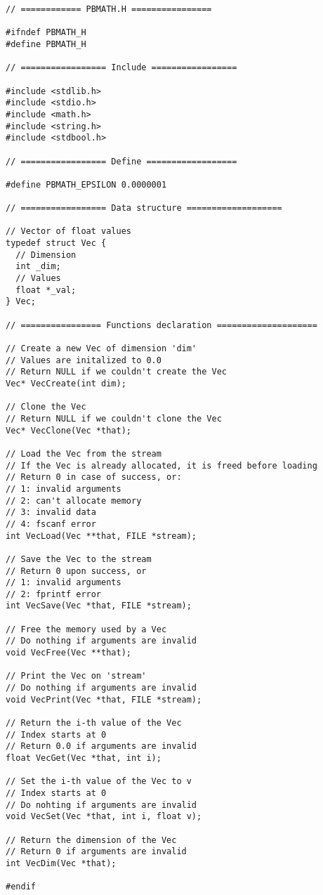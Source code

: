 \documentclass[12pt, a4paper]{article}
\begin{document}
\begin{scriptsize}
\begin{ttfamily}
\begin{lstlisting}
// ============ PBMATH.H ================

#ifndef PBMATH_H
#define PBMATH_H

// ================= Include =================

#include <stdlib.h>
#include <stdio.h>
#include <math.h>
#include <string.h>
#include <stdbool.h>

// ================= Define ==================

#define PBMATH_EPSILON 0.0000001

// ================= Data structure ===================

// Vector of float values
typedef struct Vec {
  // Dimension
  int _dim;
  // Values
  float *_val;
} Vec;

// ================ Functions declaration ====================

// Create a new Vec of dimension 'dim'
// Values are initalized to 0.0
// Return NULL if we couldn't create the Vec
Vec* VecCreate(int dim);

// Clone the Vec
// Return NULL if we couldn't clone the Vec
Vec* VecClone(Vec *that);

// Load the Vec from the stream
// If the Vec is already allocated, it is freed before loading
// Return 0 in case of success, or:
// 1: invalid arguments
// 2: can't allocate memory
// 3: invalid data
// 4: fscanf error
int VecLoad(Vec **that, FILE *stream);

// Save the Vec to the stream
// Return 0 upon success, or
// 1: invalid arguments
// 2: fprintf error
int VecSave(Vec *that, FILE *stream);

// Free the memory used by a Vec
// Do nothing if arguments are invalid
void VecFree(Vec **that);

// Print the Vec on 'stream'
// Do nothing if arguments are invalid
void VecPrint(Vec *that, FILE *stream);

// Return the i-th value of the Vec
// Index starts at 0
// Return 0.0 if arguments are invalid
float VecGet(Vec *that, int i);

// Set the i-th value of the Vec to v
// Index starts at 0
// Do nohting if arguments are invalid
void VecSet(Vec *that, int i, float v);

// Return the dimension of the Vec
// Return 0 if arguments are invalid
int VecDim(Vec *that);

#endif
\end{lstlisting}
\end{ttfamily}
\end{scriptsize}
\end{document}
